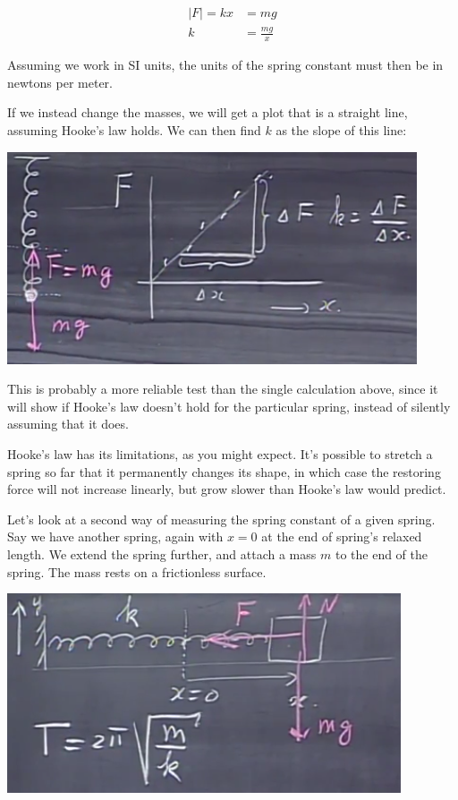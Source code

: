 \documentclass[12pt,a4paper]{report}
\begin{document}
\begin{align}
|F| = k x &= m g\\
k &= \frac{m g}{x}
\end{align}

Assuming we work in SI units, the units of the spring constant must then be in newtons per meter.

If we instead change the masses, we will get a plot that is a straight line, assuming Hooke's law holds. We can then find $k$ as the slope of this line:

\begin{center}
\includegraphics[scale=0.7]{Graphics/lec10_measure}
\end{center}

This is probably a more reliable test than the single calculation above, since it will show if Hooke's law doesn't hold for the particular spring, instead of silently assuming that it does.

Hooke's law has its limitations, as you might expect. It's possible to stretch a spring so far that it permanently changes its shape, in which case the restoring force will not increase linearly, but grow slower than Hooke's law would predict.

Let's look at a second way of measuring the spring constant of a given spring. Say we have another spring, again with $x = 0$ at the end of spring's relaxed length. We extend the spring further, and attach a mass $m$ to the end of the spring. The mass rests on a frictionless surface.

\begin{center}
\includegraphics[scale=0.7]{Graphics/lec10_sho}
\end{center}
\end{document}

